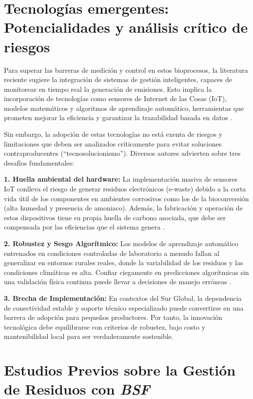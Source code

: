 \section{Tecnologías emergentes: Potencialidades y análisis crítico de riesgos}

Para superar las barreras de medición y control en estos bioprocesos, la literatura reciente sugiere la integración de sistemas de gestión inteligentes, capaces de monitorear en tiempo real la generación de emisiones. Esto implica la incorporación de tecnologías como sensores de Internet de las Cosas (IoT), modelos matemáticos y algoritmos de aprendizaje automático, herramientas que prometen mejorar la eficiencia y garantizar la trazabilidad basada en datos \parencite{AgricultureClimateChangea}.

Sin embargo, la adopción de estas tecnologías no está exenta de riesgos y limitaciones que deben ser analizados críticamente para evitar soluciones contraproducentes (“tecnosolucionismo”). Diversos autores advierten sobre tres desafíos fundamentales:

\textbf{1. Huella ambiental del hardware:} La implementación masiva de sensores IoT conlleva el riesgo de generar residuos electrónicos (e-waste) debido a la corta vida útil de los componentes en ambientes corrosivos como los de la bioconversión (alta humedad y presencia de amoniaco). Además, la fabricación y operación de estos dispositivos tiene su propia huella de carbono asociada, que debe ser compensada por las eficiencias que el sistema genera \parencite{dharCarbonImpactArtificial2020}.

\textbf{2. Robustez y Sesgo Algorítmico:} Los modelos de aprendizaje automático entrenados en condiciones controladas de laboratorio a menudo fallan al generalizar en entornos rurales reales, donde la variabilidad de los residuos y las condiciones climáticas es alta. Confiar ciegamente en predicciones algorítmicas sin una validación física continua puede llevar a decisiones de manejo erróneas \parencite{klerkxReviewSocialScience2019a}.

\textbf{3. Brecha de Implementación:} En contextos del Sur Global, la dependencia de conectividad estable y soporte técnico especializado puede convertirse en una barrera de adopción para pequeños productores. Por tanto, la innovación tecnológica debe equilibrarse con criterios de robustez, bajo costo y mantenibilidad local para ser verdaderamente sostenible.

\section{Estudios Previos sobre la Gestión de Residuos con \textit{BSF}}

